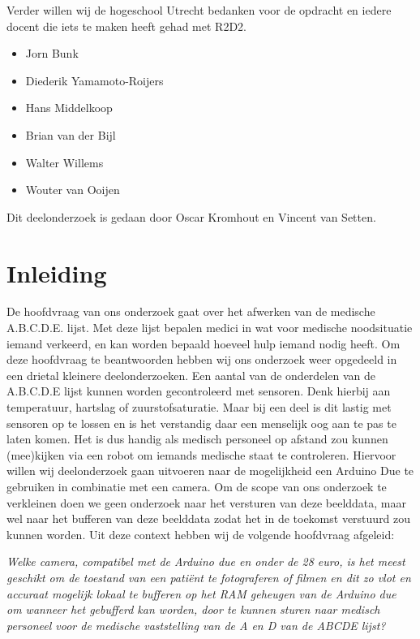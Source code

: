 \documentclass{article}
\begin{document}
Verder willen wij de hogeschool Utrecht bedanken voor de opdracht en iedere docent die iets te maken heeft gehad met R2D2.

\begin{itemize}
	\item Jorn Bunk
	\item Diederik Yamamoto-Roijers
	\item Hans Middelkoop
	\item Brian van der Bijl
	\item Walter Willems
	\item Wouter van Ooijen
\end{itemize}

Dit deelonderzoek is gedaan door Oscar Kromhout en Vincent van Setten.

\section{Inleiding}
De hoofdvraag van ons onderzoek gaat over het afwerken van de medische A.B.C.D.E. lijst. Met deze lijst bepalen medici in wat voor medische noodsituatie iemand verkeerd, en kan worden bepaald hoeveel hulp iemand nodig heeft. Om deze hoofdvraag te beantwoorden hebben wij ons onderzoek weer opgedeeld in een drietal kleinere deelonderzoeken.
Een aantal van de onderdelen van de A.B.C.D.E lijst kunnen worden gecontroleerd met sensoren. Denk hierbij aan temperatuur, hartslag of zuurstofsaturatie. Maar bij een deel is dit lastig met sensoren op te lossen en is het verstandig daar een menselijk oog aan te pas te laten komen. Het is dus handig als medisch personeel op afstand zou kunnen (mee)kijken via een robot om iemands medische staat te controleren. Hiervoor willen wij deelonderzoek gaan uitvoeren naar de mogelijkheid een Arduino Due te gebruiken in combinatie met een camera. Om de scope van ons onderzoek te verkleinen doen we geen onderzoek naar het versturen van deze beelddata, maar wel naar het bufferen van deze beelddata zodat het in de toekomst verstuurd zou kunnen worden.
Uit deze context hebben wij de volgende hoofdvraag afgeleid:

\textit{Welke camera, compatibel met de Arduino due en onder de 28 euro, is het meest geschikt om de toestand van een patiënt te fotograferen of filmen en dit zo vlot en accuraat mogelijk lokaal te bufferen op het RAM geheugen van de Arduino due om wanneer het gebufferd kan worden, door te kunnen sturen naar medisch personeel voor de medische vaststelling van de A en D van de ABCDE lijst?}
\end{document}

